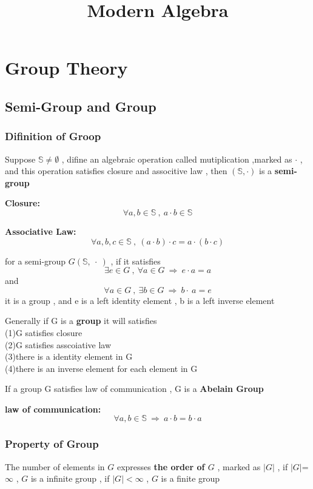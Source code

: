 \documentclass{ctexart}
\date{}
\title{Modern Algebra}
\begin{document}
	\maketitle
\tableofcontents
\newpage
\section{Group Theory}
\subsection{Semi-Group and Group}
\subsubsection{Difinition of Groop}
Suppose \(\mathbb{S}\)\(\neq\)\(\emptyset\) , difine an algebraic operation called mutiplication ,marked as \(\cdot\) , and this operation satisfies closure and associtive law , then \((\mathbb{S},\cdot)\) is a \textbf{semi-group}

\textbf{Closure:}
\[\forall a,b\in \mathbb{S}\ , \ a\cdot b\in \mathbb{S}\]


\textbf{Associative Law:}
\[\forall a,b,c\in \mathbb{S}\ , \ (a\cdot b)\cdot c=a\cdot (b\cdot c)\]

\vspace{12 pt}
for a semi-group \(G(\mathbb{S},\ \cdot\ )\) , if it satisfies
\[\exists e\in G\ , \ \forall a\in G\  \Rightarrow \ e\cdot a=a\]
and
\[\forall a\in G\ ,\ \exists b \in G\ \Rightarrow \ b\cdot\ a=e\]
it is a group , and e is a left identity element , b is a left inverse element

\vspace{12 pt}
Generally if G is a \textbf{group} it will satisfies
\\(1)G satisfies closure
\\(2)G satisfies asscoiative law
\\(3)there is a identity element in G
\\(4)there is an inverse element for each element in G

\vspace{12 pt}
If a group G satisfies law of communication , G is a \textbf{Abelain Group}

\vspace{12 pt}
\textbf{law of communication:}
\[\forall a,b\in \mathbb{S} \ \Rightarrow \ a\cdot b=b\cdot a\]

\vspace{12 pt}
\subsubsection{Property of Group}
The number of elements in \(G\) expresses \textbf{the order of \(G\)} , marked as \(\vert G \vert\) , if \(\vert G \vert \)=\(\infty\) , \(G\) is a infinite group , if \(\vert G \vert <\infty\) , \(G\) is a finite group
\end{document}
